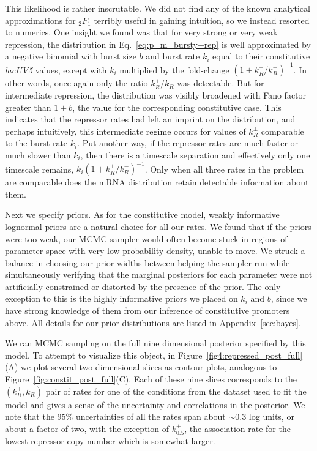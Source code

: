 This likelihood is rather inscrutable. We did not find any of the known
analytical approximations for ${_2F_1}$ terribly useful in gaining intuition, so
we instead resorted to numerics. One insight we found
was that for very strong or very weak repression, the distribution in
Eq.~\ref{eq:p_m_bursty+rep} is well approximated by a negative binomial with
burst size $b$ and burst rate $k_i$ equal to their constitutive \textit{lacUV5}
values, except with $k_i$ multiplied by the fold-change
$\left(1+k_R^+/k_R^-\right)^{-1}$. In other words, once again only the ratio
$k_R^+/k_R^-$ was detectable. But for intermediate repression, the distribution
was visibly broadened with Fano factor greater than $1+b$, the value for the
corresponding constitutive case. This indicates that the repressor rates had
left an imprint on the distribution, and perhaps intuitively, this intermediate
regime occurs for values of $k_R^\pm$ comparable to the burst rate $k_i$. Put
another way, if the repressor rates are much faster or much slower than $k_i$,
then there is a timescale separation and effectively only one timescale remains,
$k_i\left(1+k_R^+/k_R^-\right)^{-1}$. Only when all three rates in the problem
are comparable does the mRNA distribution retain detectable information about
them.

Next we specify priors. As for the constitutive model, weakly informative
lognormal priors are a natural choice for all our rates. We found that if the
priors were too weak, our MCMC sampler would often become stuck in regions of
parameter space with very low probability density, unable to move. We struck a
balance in choosing our prior widths between helping the sampler run while
simultaneously verifying that the marginal posteriors for each parameter were
not artificially constrained or distorted by the presence of the prior. The only
exception to this is the highly informative priors we placed on $k_i$ and $b$,
since we have strong knowledge of them from our inference of constitutive
promoters above. All details for our prior distributions are listed in 
Appendix~\ref{sec:bayes}.

We ran MCMC sampling on the full nine dimensional posterior specified by this
model. To attempt to visualize this object, in
Figure~\ref{fig4:repressed_post_full}(A) we plot several two-dimensional slices
as contour plots, analogous to Figure~\ref{fig:constit_post_full}(C). Each of
these nine slices corresponds to the $(k_R^+, k_R^-)$ pair of rates for one of
the conditions from the dataset used to fit the model and gives a
sense of the uncertainty and correlations in the posterior.
We note that the 95\% uncertainties of all the rates span about $\sim0.3$
log units, or about a factor of two, with the exception of $k_{0.5}^+$, the
association rate for the lowest repressor copy number which is somewhat larger.

